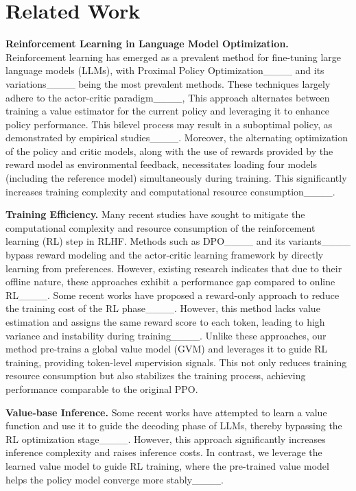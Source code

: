 \section{Related Work}
\label{related work}


\textbf{Reinforcement Learning in Language Model Optimization.}
Reinforcement learning has emerged as a prevalent method for fine-tuning large language models (LLMs), with Proximal Policy Optimization____ and its variations____ being the most prevalent methods. These techniques largely adhere to the actor-critic paradigm____, This approach alternates between training a value estimator for the current policy and leveraging it to enhance policy performance. This bilevel process may result in a suboptimal policy, as demonstrated by empirical studies____. Moreover, the alternating optimization of the policy and critic models, along with the use of rewards provided by the reward model as environmental feedback, necessitates loading four models (including the reference model) simultaneously during training. This significantly increases training complexity and computational resource consumption____.

\textbf{Training Efficiency.} Many recent studies have sought to mitigate the computational complexity and resource consumption of the reinforcement learning (RL) step in RLHF. Methods such as DPO____ and its variants____ bypass reward modeling and the actor-critic learning framework by directly learning from preferences. However, existing research indicates that due to their offline nature, these approaches exhibit a performance gap compared to online RL____. Some recent works have proposed a reward-only approach to reduce the training cost of the RL phase____. However, this method lacks value estimation and assigns the same reward score to each token, leading to high variance and instability during training____. Unlike these approaches, our method pre-trains a global value model (GVM) and leverages it to guide RL training, providing token-level supervision signals. This not only reduces training resource consumption but also stabilizes the training process, achieving performance comparable to the original PPO.

\textbf{Value-base Inference.} 
Some recent works have attempted to learn a value function and use it to guide the decoding phase of LLMs, thereby bypassing the RL optimization stage____. However, this approach significantly increases inference complexity and raises inference costs. In contrast, we leverage the learned value model to guide RL training, where the pre-trained value model helps the policy model converge more stably____.
